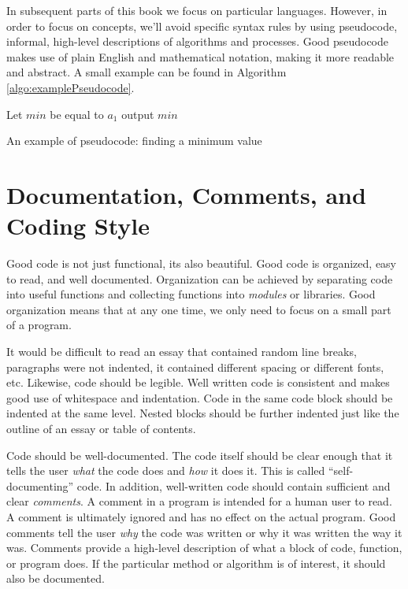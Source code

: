 In subsequent parts of this book we focus on particular languages.  However,
in order to focus on concepts, we'll avoid specific syntax rules by using
\gls{pseudocode}, informal, high-level descriptions of algorithms and 
processes.  Good pseudocode makes use of plain English and mathematical
notation, making it more readable and abstract.  A small example can 
be found in Algorithm \ref{algo:examplePseudocode}.

\begin{algorithm}
Let $min$ be equal to $a_1$ \;
output $min$ \;
\caption{An example of pseudocode: finding a minimum value}
\label{algo:examplePseudocode}
\end{algorithm}

\section{Documentation, Comments, and Coding Style}

Good code is not just functional, its also beautiful.  Good code
is organized, easy to read, and well documented.  Organization
can be achieved by separating code into useful functions and
collecting functions into \emph{modules} or libraries.  Good
organization means that at any one time, we only need to focus
on a small part of a program.  

It would be difficult to read an essay that contained
random line breaks, paragraphs were not indented, it contained
different spacing or different fonts, etc.  Likewise, code should be 
legible.  Well written code is consistent and makes good use
of whitespace and indentation.  Code in the same code block
should be indented at the same level.  Nested blocks should
be further indented just like the outline of an essay or table
of contents.

Code should be well-documented.  The code itself should be
clear enough that it tells the user \emph{what} the code does
and \emph{how} it does it.  This is called ``self-documenting''
code.  In addition, well-written code should contain sufficient and
clear \emph{comments}.  A comment in a program is intended for
a human user to read.  A comment is ultimately ignored and
has no effect on the actual program.  Good comments tell the
user \emph{why} the code was written or why it was written
the way it was.  Comments provide a high-level description of
what a block of code, function, or program does.  If the 
particular method or algorithm is of interest, it should also be
documented.  


